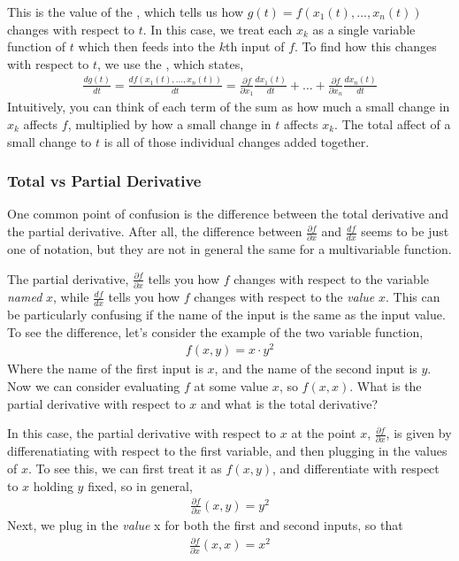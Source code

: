 This is the value of the , which tells us how $g(t) = f(x_1(t), \dots, x_n(t))$ changes with respect to $t$. In this case, we treat each $x_k$ as a single variable function of $t$ which then feeds into the $k$th input of $f$. To find how this changes with respect to $t$, we use the , which states,
\begin{align*}
    \frac{dg(t)}{dt} = \frac{df(x_1(t), \dots, x_n(t))}{dt} = \frac{\partial f}{\partial x_1} \frac{d x_1(t)}{dt} + \dots + \frac{\partial f}{\partial x_n} \frac{d x_n(t)}{dt}
\end{align*}
Intuitively, you can think of each term of the sum as how much a small change in $x_k$ affects $f$, multiplied by how a small change in $t$ affects $x_k$. The total affect of a small change to $t$ is all of those individual changes added together. 


\subsubsection*{Total vs Partial Derivative}
One common point of confusion is the difference between the total derivative and the partial derivative. After all, the difference between $\frac{\partial f}{\partial x}$ and $\frac{d f}{d x}$ seems to be just one of notation, but they are not in general the same for a multivariable function. 

The partial derivative, $\frac{\partial f}{\partial x}$ tells you how $f$ changes with respect to the variable \emph{named} $x$, while $\frac{df}{dx}$ tells you how $f$ changes with respect to the \emph{value} $x$. This can be particularly confusing if the name of the input is the same as the input value. To see the difference, let's consider the example of the two variable function, 
\begin{align*}
    f(x, y) = x \cdot y^2
\end{align*}
Where the name of the first input is $x$, and the name of the second input is $y$. Now we can consider evaluating $f$ at some value $x$, so $f(x, x)$. What is the partial derivative with respect to $x$ and what is the total derivative?

In this case, the partial derivative with respect to $x$ at the point $x$, $\frac{\partial f}{\partial x}$, is given by differenatiating with respect to the first variable, and then plugging in the values of $x$. To see this, we can first treat it as $f(x, y)$, and differentiate with respect to $x$ holding $y$ fixed, so in general,
\begin{align*}
    \frac{\partial f}{\partial x}(x, y) = y^2
\end{align*}
Next, we plug in the \emph{value} x for both the first and second inputs, so that
\begin{align*}
    \frac{\partial f}{\partial x}(x, x) = x^2
\end{align*}

